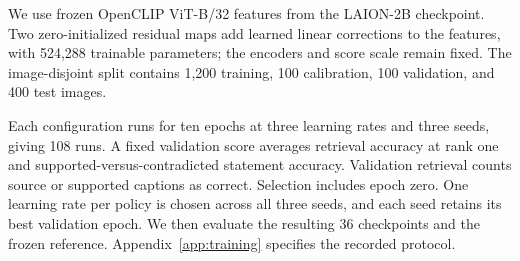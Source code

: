 We use frozen OpenCLIP ViT-B/32 features from the LAION-2B checkpoint. Two zero-initialized residual maps add learned linear corrections to the features, with 524,288 trainable parameters; the encoders and score scale remain fixed. The image-disjoint split contains 1,200 training, 100 calibration, 100 validation, and 400 test images.

Each configuration runs for ten epochs at three learning rates and three seeds, giving 108 runs. A fixed validation score averages retrieval accuracy at rank one and supported-versus-contradicted statement accuracy. Validation retrieval counts source or supported captions as correct. Selection includes epoch zero. One learning rate per policy is chosen across all three seeds, and each seed retains its best validation epoch. We then evaluate the resulting 36 checkpoints and the frozen reference. Appendix~\ref{app:training} specifies the recorded protocol.
